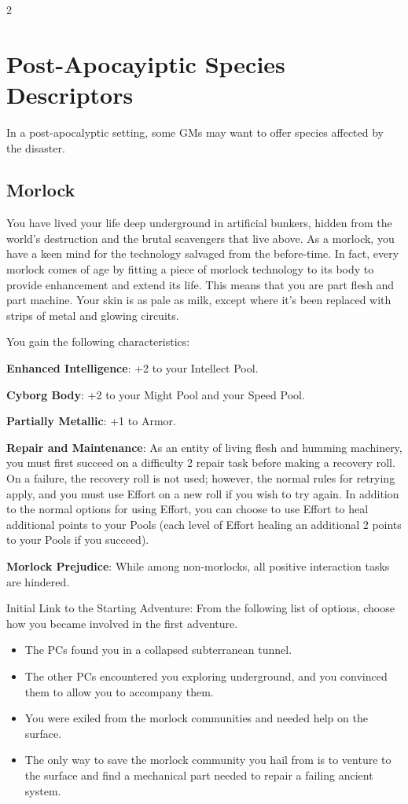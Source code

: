 \begin{multicols}{2}

\chapter{Post-Apocayiptic Species Descriptors}

In a post-apocalyptic setting, some GMs may want to offer species affected by the disaster.

\section{Morlock}

You have lived your life deep underground in artificial bunkers, hidden from the world’s destruction and the brutal scavengers that live above. As a morlock, you have a keen mind for the technology salvaged from the before-time. In fact, every morlock comes of age by fitting a piece of morlock technology to its body to provide enhancement and extend its life. This means that you are part flesh and part machine. Your skin is as pale as milk, except where it’s been replaced with strips of metal and glowing circuits.

You gain the following characteristics:

\textbf{Enhanced Intelligence}: +2 to your Intellect Pool. 

\textbf{Cyborg Body}: +2 to your Might Pool and your Speed Pool.

\textbf{Partially Metallic}: +1 to Armor.

\textbf{Repair and Maintenance}: As an entity of living flesh and humming machinery, you must first succeed on a difficulty 2 repair task before making a recovery roll. On a failure, the recovery roll is not used; however, the normal rules for retrying apply, and you must use Effort on a new roll if you wish to try again. In addition to the normal options for using Effort, you can choose to use Effort to heal additional points to your Pools (each level of Effort healing an additional 2 points to your Pools if you succeed).

\textbf{Morlock Prejudice}: While among non-morlocks, all positive interaction tasks are hindered.

Initial Link to the Starting Adventure: From the following list of options, choose how you became involved in the first adventure.
\begin{itemize}
\item The PCs found you in a collapsed subterranean tunnel.
\item The other PCs encountered you exploring underground, and you convinced them to allow you to accompany them.
\item You were exiled from the morlock communities and needed help on the surface.
\item The only way to save the morlock community you hail from is to venture to the surface and find a mechanical part needed to repair a failing ancient system.
\end{itemize}


\end{multicols}
